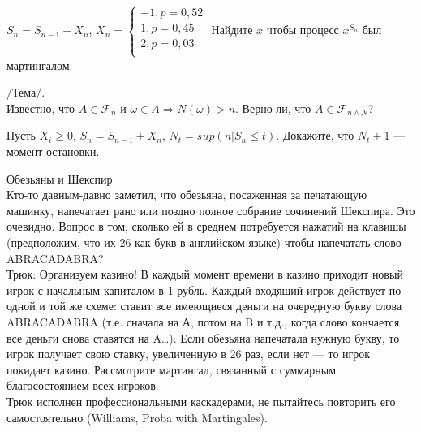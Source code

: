 \begin{problem}
 [Steele, 2.1.] 
$S_{n}=S_{n-1}+X_{n}$, 
$X_{n}= 
\begin{cases}
	-1, p=0,52 \\ 
	1, p=0,45 \\ 
	2, p=0,03 \\ 
\end{cases} $ 
Найдите $x$ чтобы процесс $x^{S_{n}}$ был мартингалом.
\end{problem} 
\begin{solution} 

\end{solution}

\begin{problem}
 /Тема/. \\
Известно, что $A\in\mathcal{F}_{n}$ и $\omega\in A \Rightarrow
N(\omega)>n$. Верно ли, что $A \in \mathcal{F}_{n\wedge N}$? 
\end{problem} 
\begin{solution} 

\end{solution}

\begin{problem}
Пусть $X_{i}\ge 0$, $S_{n}=S_{n-1}+X_{n}$, $N_{t}=sup(n|S_{n}\le
t)$. Докажите, что $N_{t}+1$ --- момент остановки. 
\end{problem} 
\begin{solution} 

\end{solution}

\begin{problem}
 Обезьяны и Шекспир \\
Кто-то давным-давно заметил, что обезьяна, посаженная за
печатающую машинку, напечатает рано или поздно полное собрание
сочинений Шекспира. Это очевидно. Вопрос в том, сколько ей в
среднем потребуется нажатий на клавишы (предположим, что их 26 как
букв в
английском языке) чтобы напечатать слово ABRACADABRA? \\
Трюк: Организуем казино! В каждый момент времени в казино приходит
новый игрок с начальным капиталом в 1 рубль. Каждый входящий игрок
действует по одной и той же схеме: ставит все имеющиеся деньги на
очередную букву слова ABRACADABRA (т.е. сначала на А, потом на B и
т.д., когда слово кончается все деньги снова ставятся на A\ldots).
Если обезьяна напечатала нужную букву, то игрок получает свою
ставку, увеличенную в 26 раз, если нет --- то игрок покидает казино.
Рассмотрите мартингал, связанный с суммарным благосостоянием всех
игроков. \\
Трюк исполнен профессиональными каскадерами, не пытайтесь
повторить его самостоятельно (Williams, Proba with Martingales). 
\end{problem} 
\begin{solution} 

\end{solution}

